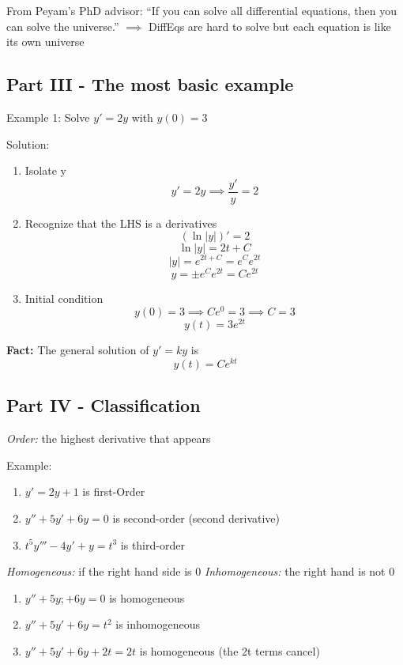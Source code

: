 \documentclass[12pt]{article}
\begin{document}
From Peyam's PhD advisor:
“If you can solve all differential equations, then you can solve the universe.” $\implies$ DiffEqs are hard to solve but each equation is like its own universe 

\subsection*{Part III - The most basic example}
Example 1: Solve $y' = 2y$ with $y(0) = 3$

Solution:
\begin{enumerate}
    \item Isolate y
    \[y' = 2y \implies \frac{y'}{y} = 2\]

    \item Recognize that the LHS is a derivatives
    \[(\ln |y|)' = 2\]
    \[\ln |y| = 2t + C\]
    \[|y| = e^{2t + C} = e^Ce^{2t}\]
    \[y = \pm e^C e^{2t} = Ce^{2t}\]

    \item Initial condition
    \[y(0) = 3 \implies Ce^0 = 3 \implies C = 3\]
    \[\boxed{y(t) = 3e^{2t}}\]
\end{enumerate}

\textbf{Fact:}
The general solution of $y' = ky$ is 
\[\boxed{y(t) = Ce^{kt}}\]

\subsection*{Part IV - Classification}
\emph{Order:} the highest derivative that appears

Example: 
\begin{enumerate}
    \item $y' = 2y + 1$ is first-Order
    \item $y'' + 5y'+ 6y = 0$ is second-order (second derivative)
    \item $t^5 y''' - 4y' + y = t^3$ is third-order
\end{enumerate}

\emph{Homogeneous:} if the right hand side is 0
\emph{Inhomogeneous:} the right hand is not 0
\begin{enumerate}
    \item $y'' + 5y; + 6y = 0$ is homogeneous
    \item $y'' + 5y' + 6y = t^2$ is inhomogeneous
    \item $y'' + 5y' + 6y + 2t = 2t$ is homogeneous (the 2t terms cancel)
\end{enumerate}
\end{document}
